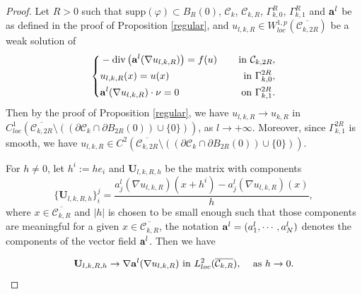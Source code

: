 \documentclass[12pt]{amsart}
\theoremstyle{definition}
\theoremstyle{remark}
\theoremstyle{conclusion}
\theoremstyle{conjecture}
\numberwithin{equation}{section}
\begin{document}
\begin{proof}
Let $R>0$ such that $\text{supp}(\varphi)\subset B_R(0)$, $\mathcal{C}_k$, $\mathcal{C}_{k,R}$, $\Gamma_{k,0}^R$, $\Gamma_{k,1}^R$ and ${\bf{a}}^l$ be as defined in the proof of Proposition \ref{regular}, and $u_{l,k,R}\in W^{1,p}_{loc}(\overline{\mathcal{C}_{k,2R}})$ be a weak solution of
\begin{equation*}
 \left\{
         \begin{aligned}
         & -\operatorname{div}\left({\bf{a}}^l(\nabla u_{l,k,R})\right)=f(u)\quad \, &{\rm{in}}\,\, \mathcal{C}_{k,2R},\\
         &u_{l,k,R}(x)=u(x)\quad \, &{\rm{in}}\ \Gamma_{k,0}^{2R},\\
         &{\bf{a}}^l(\nabla u_{l,k,R})\cdot \nu =0\quad\, &{\rm{on}}\,\,\Gamma_{k,1}^{2R}.
         \end{aligned}
         \right.
\end{equation*}
Then by the proof of Proposition \ref{regular}, we have $u_{l,k,R}\rightarrow u_{k,R}$ in $C^{1}_{loc}(\overline{\mathcal{C}_{k,2R}}\setminus((\partial\mathcal{C}_k\cap\partial B_{2R}(0))\cup\{0\}))$, as $l\rightarrow+\infty$. Moreover, since $\Gamma_{k,1}^{2R}$ is smooth, we have $u_{l,k,R}\in C^2(\overline{\mathcal{C}_{k,2R}}\setminus((\partial\mathcal{C}_k\cap\partial B_{2R}(0))\cup\{0\}))$.


For $h\neq0$, let $h^i:=he_i$ and $\mathbf{U}_{l,k,R,h}$ be the matrix with components
$$\{\mathbf{U}_{l,k,R,h}\}_i^j=\frac{{{a}}^l_j(\nabla u_{l,k,R})(x+h^i)-{{a}}^l_j(\nabla u_{l,k,R})(x)}{h},$$
where $x\in \overline{\mathcal{C}_{k,R}}$ and $|h|$ is chosen to be small enough such that those components are meaningful for a given $x\in\overline{\mathcal{C}_{k,R}}$, the notation ${\bf{a}}^l=({a}^l_1,\cdots,{{a}}^l_N)$ denotes the components of the vector field ${\bf{a}}^l$. Then we have

\begin{equation}\label{U}
  \mathbf{U}_{l,k,R,h}\rightarrow \nabla {\bf{a}}^l(\nabla u_{l,k,R})\,\,\text{in}\,\, L^2_{loc}(\overline{\mathcal{C}_{k,R}}),\quad\,\text{as}\,\,h\rightarrow 0.
\end{equation}



\end{proof}
\end{document}
